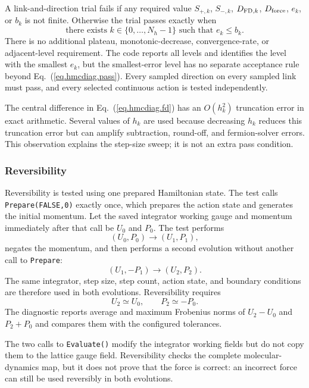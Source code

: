 A link-and-direction trial fails if any required value
$S_{+,k}$, $S_{-,k}$, $D_{{\rm FD},k}$, $D_{\rm force}$, $e_k$, or $b_k$ is
not finite.  Otherwise the trial passes exactly when
\begin{equation}
\text{there exists }k\in\{0,\ldots,N_h-1\}\text{ such that }e_k\leq b_k.
\label{eq.hmcdiag.pass}
\end{equation}
There is no additional plateau, monotonic-decrease, convergence-rate, or
adjacent-level requirement.  The code reports all levels and identifies the
level with the smallest $e_k$, but the smallest-error level has no separate
acceptance rule beyond Eq.~(\ref{eq.hmcdiag.pass}).  Every sampled direction
on every sampled link must pass, and every selected continuous action is
tested independently.

The central difference in Eq.~(\ref{eq.hmcdiag.fd}) has an $O(h_k^2)$
truncation error in exact arithmetic.  Several values of $h_k$ are used because
decreasing $h_k$ reduces this truncation error but can amplify subtraction,
round-off, and fermion-solver errors.  This observation explains the step-size
sweep; it is not an extra pass condition.

\subsubsection{\label{sec:hmcdiag_rev}Reversibility}

Reversibility is tested using one prepared Hamiltonian state.  The test calls
\texttt{Prepare(FALSE,0)} exactly once, which prepares the action state and
generates the initial momentum.  Let the saved integrator working gauge and
momentum immediately after that call be $U_0$ and $P_0$.  The test performs
\begin{equation}
(U_0,P_0)\longrightarrow(U_1,P_1),
\end{equation}
negates the momentum, and then performs a second evolution without another
call to \texttt{Prepare}:
\begin{equation}
(U_1,-P_1)\longrightarrow(U_2,P_2).
\end{equation}
The same integrator, step size, step count, action state, and boundary
conditions are therefore used in both evolutions.  Reversibility requires
\begin{equation}
U_2\simeq U_0,\qquad P_2\simeq -P_0.
\end{equation}
The diagnostic reports average and maximum Frobenius norms of $U_2-U_0$ and
$P_2+P_0$ and compares them with the configured tolerances.

The two calls to \texttt{Evaluate()} modify the integrator working fields but
do not copy them to the lattice gauge field.  Reversibility checks the complete
molecular-dynamics map, but it does not prove that the force is correct: an
incorrect force can still be used reversibly in both evolutions.
